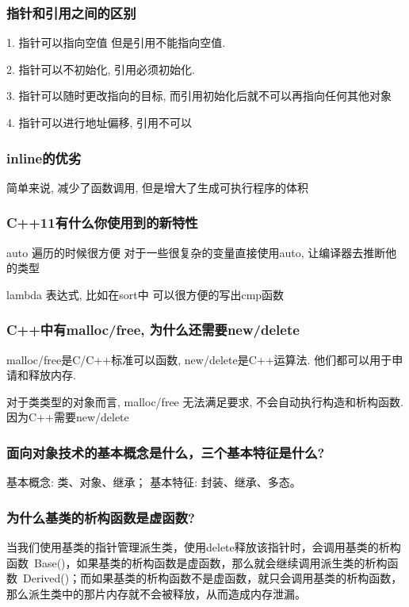 \subsubsection{指针和引用之间的区别}
1. 指针可以指向空值 但是引用不能指向空值. \par
2. 指针可以不初始化, 引用必须初始化. \par
3. 指针可以随时更改指向的目标, 而引用初始化后就不可以再指向任何其他对象 \par
4. 指针可以进行地址偏移, 引用不可以 \par
\subsubsection{inline的优劣}
简单来说, 减少了函数调用, 但是增大了生成可执行程序的体积 \par
\subsubsection{C++11有什么你使用到的新特性}
auto 遍历的时候很方便 对于一些很复杂的变量直接使用auto, 让编译器去推断他的类型\par
lambda 表达式, 比如在sort中 可以很方便的写出cmp函数 \par
\subsubsection{C++中有malloc/free, 为什么还需要new/delete}
malloc/free是C/C++标准可以函数, new/delete是C++运算法. 他们都可以用于申请和释放内存. \par
对于类类型的对象而言, malloc/free 无法满足要求, 不会自动执行构造和析构函数. 因为C++需要new/delete \par
\subsubsection{面向对象技术的基本概念是什么，三个基本特征是什么?}
基本概念: 类、对象、继承； 基本特征: 封装、继承、多态。\par
\subsubsection{为什么基类的析构函数是虚函数?}
当我们使用基类的指针管理派生类，使用delete释放该指针时，会调用基类的析构函数~Base()，如果基类的析构函数是虚函数，那么就会继续调用派生类的析构函数~Derived()；而如果基类的析构函数不是虚函数，就只会调用基类的析构函数，那么派生类中的那片内存就不会被释放，从而造成内存泄漏。 \par
